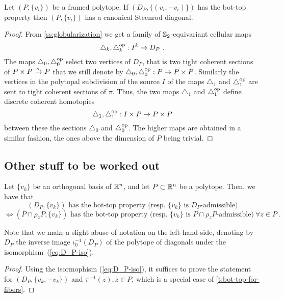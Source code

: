 \begin{theorem}
	Let $(P,\{v_i\})$ be a framed polytope.
	If $(D_P, \{(v_i,-v_i)\})$ has the bot-top property then
	$(P,\{v_i\})$ has a canonical Steenrod diagonal.
\end{theorem}

\begin{proof}
	From \cref{ss:globularization} we get a family of $\mathbb{S}_2$-equivariant cellular maps
	\[
	\triangle_k, \triangle_k^{\mathrm{op}} : I^k \to D_P \ .
	\]
	The maps $\triangle_0, \triangle_0^{\mathrm{op}}$ select two vertices of $D_P$, that is two tight coherent sections of $P\times P \xrightarrow{\pi} P$ that we still denote by $\triangle_0, \triangle_0^{\mathrm{op}} : P \to P\times P$.
	Similarly the vertices in the polytopal subdivision of the source $I$ of the maps $\triangle_1$ and $\triangle_1^{\mathrm{op}}$ are sent to tight coherent sections of $\pi$.
	Thus, the two maps $\triangle_1$ and $\triangle_1^{\mathrm{op}}$ define discrete coherent homotopies
	\[
	\triangle_1, \triangle_1^{\mathrm{op}} : I\times P \to P \times P
	\]
	between these the sections $\triangle_0$ and $\triangle_0^{\mathrm{op}}$.
	The higher maps are obtained in a similar fashion, the ones above the dimension of $P$ being trivial.
\end{proof}

\subsection{Other stuff to be worked out}

\begin{lemma} \label{l:bot-top-for-DP}
	Let $\{v_k\}$ be an orthogonal basis of $\mathbb{R}^n$, and let $P\subset \mathbb{R}^n$ be a polytope.
	Then, we have that
	\[
	(D_P,\{v_k\}) \text{ has the bot-top property (resp. } \{v_k\} \text{ is }D_P\text{-admissible)}
	\]
	\[
	\iff (P\cap \rho_z P,\{v_k\}) \text{ has the bot-top property (resp. } \{v_k\} \text{ is }P\cap \rho_z P\text{-admissible)} \ \forall z \in P \ .
	\]
\end{lemma}

Note that we make a slight abuse of notation on the left-hand side, denoting by $D_P$ the inverse image $\iota_0^{-1}(D_P)$ of the polytope of diagonals under the isomorphism~(\ref{eq:D_P-iso}).

\begin{proof}
	Using the isormophism (\ref{eq:D_P-iso}), it suffices to prove the statement for $(D_P,\{v_k,-v_k\})$ and $\pi^{-1}(z), z \in P$, which is a special case of \cref{t:bot-top-for-fibers}.
\end{proof}

